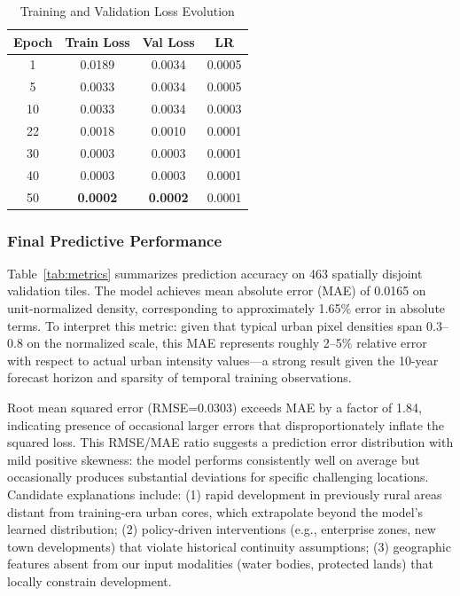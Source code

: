 \documentclass[conference]{IEEEtran}
\begin{document}
\begin{table}[htbp]
\caption{Training and Validation Loss Evolution}
\begin{center}
\begin{tabular}{cccc}
\toprule
\textbf{Epoch} & \textbf{Train Loss} & \textbf{Val Loss} & \textbf{LR} \\
\midrule
1  & 0.0189 & 0.0034 & 0.0005 \\
5  & 0.0033 & 0.0034 & 0.0005 \\
10 & 0.0033 & 0.0034 & 0.0003 \\
22 & 0.0018 & 0.0010 & 0.0001 \\
30 & 0.0003 & 0.0003 & 0.0001 \\
40 & 0.0003 & 0.0003 & 0.0001 \\
50 & \textbf{0.0002} & \textbf{0.0002} & 0.0001 \\
\bottomrule
\end{tabular}
\label{tab:training}
\end{center}
\end{table}

\subsubsection{Final Predictive Performance}
Table~\ref{tab:metrics} summarizes prediction accuracy on 463 spatially disjoint validation tiles. The model achieves mean absolute error (MAE) of 0.0165 on unit-normalized density, corresponding to approximately 1.65\% error in absolute terms. To interpret this metric: given that typical urban pixel densities span 0.3--0.8 on the normalized scale, this MAE represents roughly 2--5\% relative error with respect to actual urban intensity values---a strong result given the 10-year forecast horizon and sparsity of temporal training observations.

Root mean squared error (RMSE=0.0303) exceeds MAE by a factor of 1.84, indicating presence of occasional larger errors that disproportionately inflate the squared loss. This RMSE/MAE ratio suggests a prediction error distribution with mild positive skewness: the model performs consistently well on average but occasionally produces substantial deviations for specific challenging locations. Candidate explanations include: (1) rapid development in previously rural areas distant from training-era urban cores, which extrapolate beyond the model's learned distribution; (2) policy-driven interventions (e.g., enterprise zones, new town developments) that violate historical continuity assumptions; (3) geographic features absent from our input modalities (water bodies, protected lands) that locally constrain development.
\end{document}
